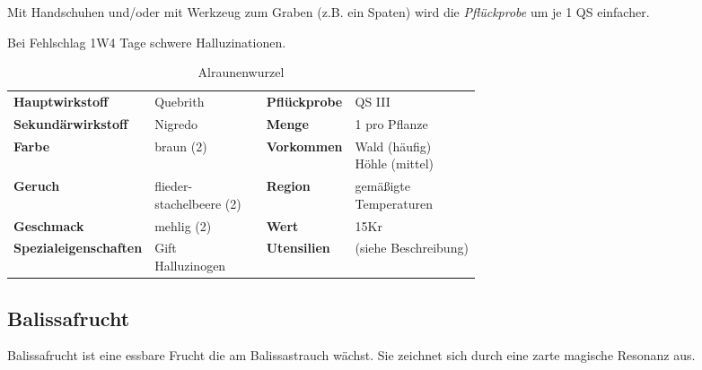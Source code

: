 Mit Handschuhen und/oder mit Werkzeug zum Graben (z.B. ein Spaten) wird die \textit{Pflückprobe} um je 1 QS einfacher.

Bei Fehlschlag 1W4 Tage schwere Halluzinationen.

\begin{table}[H] 
\begin{center} 
\begin{tabular}{|l|l|p{1cm}|l|l|} 
  	\cline{1-2} \cline{4-5} 
  	\textbf{Hauptwirkstoff} & Quebrith && \textbf{Pflückprobe} & QS III \\ \cline{1-2} \cline{4-5} 
  	\textbf{Sekundärwirkstoff} & Nigredo && \textbf{Menge} & 1 pro Pflanze \\ \cline{1-2} \cline{4-5} 
  	\textbf{Farbe} & braun (2) && \textbf{Vorkommen} & \brcell{Wald (häufig) \\ Höhle (mittel)} \\ \cline{1-2} \cline{4-5} 
  	\textbf{Geruch} & \brcell{flieder- \\ stachelbeere (2)} && \textbf{Region} & \brcell{gemäßigte \\ Temperaturen} \\ \cline{1-2} \cline{4-5} 
  	\textbf{Geschmack} & mehlig (2) && \textbf{Wert} & 15Kr \\ \cline{1-2} \cline{4-5} 
  	\textbf{Spezialeigenschaften} & \brcell{Gift \\ Halluzinogen} && \textbf{Utensilien} & (siehe Beschreibung) \\ \cline{1-2} \cline{4-5} 
\end{tabular} 
\end{center} 
\caption{Alraunenwurzel} 
\label{tab:alraunenwurzel} 
\end{table}


\subsection{Balissafrucht}
Balissafrucht ist eine essbare Frucht die am Balissastrauch wächst. Sie zeichnet sich durch eine zarte magische Resonanz aus. 

